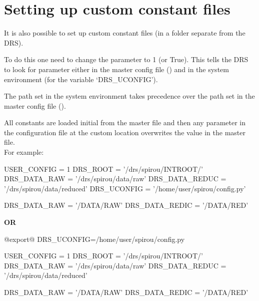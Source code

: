 \clearpage
\newpage
\section{Setting up custom constant files}
\label{ch:install:custom_constant_files}

It is also possible to set up custom constant files (in a folder separate from the DRS).

To do this one need to change the  parameter to 1 (or True). This tells the DRS to look for  parameter either in the master config file (\configtxtfile) and in the system environment (for the variable `DRS\_UCONFIG').

\begin{note}
The path set in the system environment takes precedence over the path set in the master config file (\configtxtfile).
\end{note}

\noindent All constants are loaded initial from the master file and then any parameter in the configuration file at the custom location overwrites the value in the master file. \\

\noindent For example:

\begin{textbox}[title={In ".../INTROOT/config/config.py"}]
USER_CONFIG = 1
DRS_ROOT = '/drs/spirou/INTROOT/'
DRS_DATA_RAW = '/drs/spirou/data/raw'
DRS_DATA_REDUC = '/drs/spirou/data/reduced'
DRS_UCONFIG = '/home/user/spirou/config.py'
\end{textbox}
\begin{textbox}[title={In "/home/user/spirou/config.py"}]
DRS_DATA_RAW = '/DATA/RAW'
DRS_DATA_REDIC = '/DATA/RED'
\end{textbox}

\noindent \textbf{OR}

\begin{bashbox}[title={e.g. in $\sim$/.bashrc or $\sim$/.bash\_profile}]
@export@ DRS_UCONFIG=/home/user/spirou/config.py
\end{bashbox}
\begin{textbox}[title={In ".../INTROOT/config/config.py"}]
USER_CONFIG = 1
DRS_ROOT = '/drs/spirou/INTROOT/'
DRS_DATA_RAW = '/drs/spirou/data/raw'
DRS_DATA_REDUC = '/drs/spirou/data/reduced'
\end{textbox}
\begin{textbox}[title={In "/home/user/spirou/config.py"}]
DRS_DATA_RAW = '/DATA/RAW'
DRS_DATA_REDIC = '/DATA/RED'
\end{textbox}

